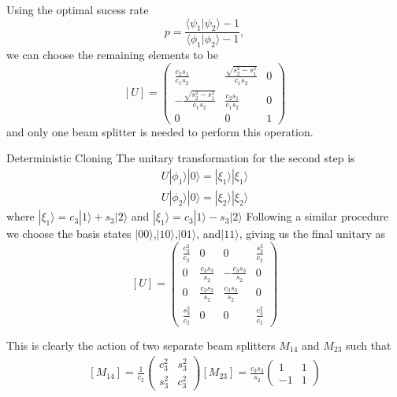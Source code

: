 \documentclass{beamer}
\newcommand{\ke}[1]{|#1\rangle}
\newcommand{\bk}[2]{\langle #1|#2\rangle}
\begin{document}
\begin{frame}
Using the optimal sucess rate 
\begin{equation}
p = \frac{\bk{\psi_1}{\psi_2}-1}{\bk{\phi_1}{\phi_2}-1},
\end{equation}
 we can choose the remaining elements to be
\begin{equation}
{}[U]=
\begin{pmatrix}\frac{c_2s_1}{c_1s_2}& \frac{\sqrt{s_2^2-s_1^2}}{c_1s_2} & 0\\
-\frac{\sqrt{s_2^2-s_1^2}}{c_1s_2} &\frac{c_2s_1}{c_1s_2} & 0 \\
0 & 0 & 1
\end{pmatrix}
\end{equation}
and only one beam splitter is needed to perform this operation.
\end{frame}
\begin{frame}{Deterministic Cloning}
The unitary transformation
for the second step is
\begin{eqnarray}
U\ke {\phi_1} \ke 0 = \ke{\xi_1}\ke{\xi_1}\\
U\ke {\phi_2} \ke 0 = \ke{\xi_2}\ke{\xi_2}
\end{eqnarray}
where 
$\ke {\xi_1} = c_3 \ke{1} + s_3 \ke{2}$ and
$\ke {\xi_1} = c_3 \ke{1} - s_3 \ke{2}$
Following a similar procedure we choose the basis states $ \ke {00}$,$ \ke {10}$,$ \ke {01}$, and$ \ke {11}$,
giving us the final unitary as 
\begin{equation}
{}[U]=
\begin{pmatrix} \frac{c_3^2}{c_2} &0 & 0 &\frac{s_3^2}{c_2}\\
0 &\frac{c_3 s_3}{s_2} &-\frac{c_3 s_3}{s_2}&0 \\
0 &\frac{c_3 s_3}{s_2} &\frac{c_3 s_3}{s_2}&0 \\
\frac{s_3^2}{c_2} & 0&0&\frac{c_3^2}{c_2}
\end{pmatrix}
\end{equation}
\end{frame}
\begin{frame}
This is clearly the action of two separate beam splitters $M_{14}$ and $M_{23}$ such that
\begin{eqnarray}
{}[M_{14}]=\frac{1}{c_2}
\begin{pmatrix}{c_3^2} &s_3^2\\
 {s_3^2}&{c_3^2}
\end{pmatrix}
{}[M_{23}]=\frac{c_3 s_3}{s_2}
\begin{pmatrix}1 &1 \\
-1 & 1
\end{pmatrix}
\end{eqnarray}
\end{frame}
\end{document}
